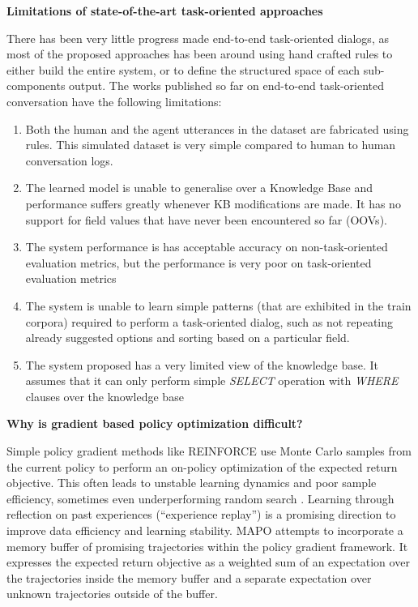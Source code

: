 \noindent \textbf{Limitations of state-of-the-art task-oriented approaches}

There has been very little progress made end-to-end task-oriented dialogs, as most of the proposed approaches has been around using hand crafted rules to either build the entire system, or to define the structured space of each sub-components output. The works published so far on end-to-end task-oriented conversation have the following limitations:
\begin{enumerate}
\item Both the human and the agent utterances in the dataset are fabricated using rules. This simulated dataset is very simple compared to human to human conversation logs.
\item The learned model is unable to generalise over a Knowledge Base and performance suffers greatly whenever KB modifications are made. It has no support for field values that have never been encountered so far (OOVs).
\item The system performance is has acceptable accuracy on non-task-oriented evaluation metrics, but the performance is very poor on task-oriented evaluation metrics
\item The system is unable to learn simple patterns (that are exhibited in the train corpora) required to perform a task-oriented dialog, such as not repeating already suggested options and sorting based on a particular field.
\item The system proposed has a very limited view of the knowledge base. It assumes that it can only perform simple {\em SELECT} operation with {\em WHERE} clauses over the knowledge base
\end{enumerate} 

\noindent \textbf{Why is gradient based policy optimization difficult?}

Simple policy gradient methods like REINFORCE \cite{williams1992simple} use Monte Carlo samples from the current policy to perform an on-policy optimization of the expected return objective. This often leads to unstable learning dynamics and poor sample efficiency, sometimes even underperforming random search \cite{mania2018simple}. Learning through reflection on past experiences (“experience replay”) is a promising direction to improve data efficiency and learning stability. MAPO \cite{NIPS2018_8204} attempts to incorporate a memory buffer of promising trajectories within the policy gradient framework. It expresses the expected return objective as a weighted sum of an expectation over the trajectories inside the memory buffer and a separate expectation over unknown trajectories outside of the buffer. 


